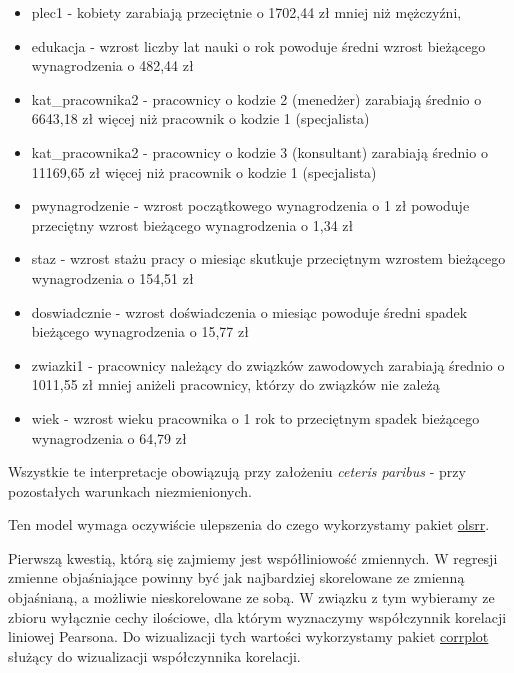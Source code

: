 \documentclass[
]{book}
\newenvironment{Shaded}{\begin{snugshade}}{\end{snugshade}}
\newcommand{\DataTypeTok}[1]{\textcolor[rgb]{0.13,0.29,0.53}{#1}}
\newcommand{\KeywordTok}[1]{\textcolor[rgb]{0.13,0.29,0.53}{\textbf{#1}}}
\newcommand{\NormalTok}[1]{#1}
\newcommand{\OperatorTok}[1]{\textcolor[rgb]{0.81,0.36,0.00}{\textbf{#1}}}
\newcommand{\StringTok}[1]{\textcolor[rgb]{0.31,0.60,0.02}{#1}}
\providecommand{\tightlist}{%
  \setlength{\itemsep}{0pt}\setlength{\parskip}{0pt}}
\begin{document}
\begin{itemize}
\tightlist
\item
  plec1 - kobiety zarabiają przeciętnie o 1702,44 zł mniej niż mężczyźni,
\item
  edukacja - wzrost liczby lat nauki o rok powoduje średni wzrost bieżącego wynagrodzenia o 482,44 zł
\item
  kat\_pracownika2 - pracownicy o kodzie 2 (menedżer) zarabiają średnio o 6643,18 zł więcej niż pracownik o kodzie 1 (specjalista)
\item
  kat\_pracownika2 - pracownicy o kodzie 3 (konsultant) zarabiają średnio o 11169,65 zł więcej niż pracownik o kodzie 1 (specjalista)
\item
  pwynagrodzenie - wzrost początkowego wynagrodzenia o 1 zł powoduje przeciętny wzrost bieżącego wynagrodzenia o 1,34 zł
\item
  staz - wzrost stażu pracy o miesiąc skutkuje przeciętnym wzrostem bieżącego wynagrodzenia o 154,51 zł
\item
  doswiadcznie - wzrost doświadczenia o miesiąc powoduje średni spadek bieżącego wynagrodzenia o 15,77 zł
\item
  zwiazki1 - pracownicy należący do związków zawodowych zarabiają średnio o 1011,55 zł mniej aniżeli pracownicy, którzy do związków nie zależą
\item
  wiek - wzrost wieku pracownika o 1 rok to przeciętnym spadek bieżącego wynagrodzenia o 64,79 zł
\end{itemize}

Wszystkie te interpretacje obowiązują przy założeniu \emph{ceteris paribus} - przy pozostałych warunkach niezmienionych.

Ten model wymaga oczywiście ulepszenia do czego wykorzystamy pakiet \href{https://cran.r-project.org/web/packages/olsrr/index.html}{olsrr}.

Pierwszą kwestią, którą się zajmiemy jest współliniowość zmiennych. W regresji zmienne objaśniające powinny być jak najbardziej skorelowane ze zmienną objaśnianą, a możliwie nieskorelowane ze sobą. W związku z tym wybieramy ze zbioru wyłącznie cechy ilościowe, dla którym wyznaczymy współczynnik korelacji liniowej Pearsona. Do wizualizacji tych wartości wykorzystamy pakiet \href{https://cran.r-project.org/web/packages/corrplot/}{corrplot} służący do wizualizacji współczynnika korelacji.

\begin{Shaded}
\end{Shaded}
\end{document}
